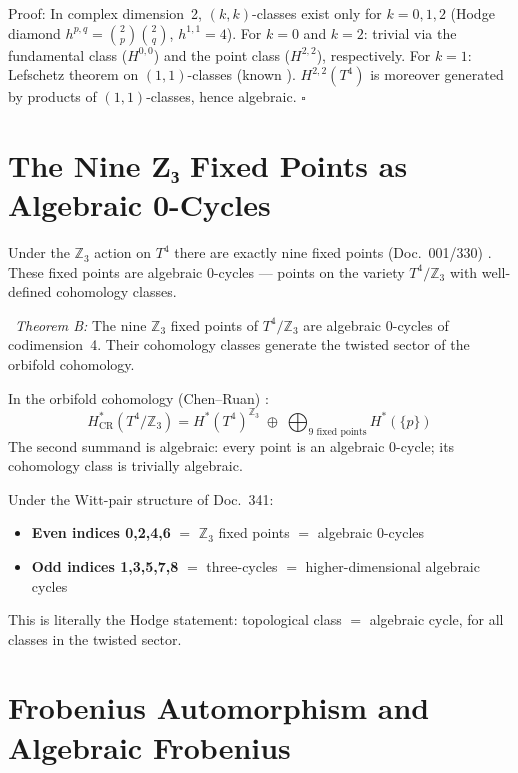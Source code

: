 Proof: In complex dimension~2, $(k,k)$-classes exist only for $k = 0,1,2$
(Hodge diamond $h^{p,q} = \binom{2}{p}\binom{2}{q}$, $h^{1,1} = 4$).
For $k=0$ and $k=2$: trivial via the fundamental class ($H^{0,0}$)
and the point class ($H^{2,2}$), respectively.
For $k=1$: Lefschetz theorem on $(1,1)$-classes (known \EM).
$H^{2,2}(T^4)$ is moreover generated by products of $(1,1)$-classes,
hence algebraic. \hfill$\square$

\section{The Nine Z₃ Fixed Points as Algebraic 0-Cycles}

Under the $\mathbb{Z}_3$ action on $T^4$ there are exactly nine fixed points
(Doc.~001/330) \BM. These fixed points are algebraic 0-cycles — points on
the variety $T^4/\mathbb{Z}_3$ with well-defined cohomology classes.

\BM\ \textit{Theorem B:} The nine $\mathbb{Z}_3$ fixed points of
$T^4/\mathbb{Z}_3$ are algebraic 0-cycles of codimension~4. Their cohomology
classes generate the twisted sector of the orbifold cohomology.

In the orbifold cohomology (Chen--Ruan) \QM:
\[
H^*_{\mathrm{CR}}(T^4/\mathbb{Z}_3)
= H^*(T^4)^{\mathbb{Z}_3}
\;\oplus\; \bigoplus_{\text{9 fixed points}} H^*(\{p\})
\]
The second summand is algebraic: every point is an algebraic 0-cycle; its
cohomology class is trivially algebraic. \EM

Under the Witt-pair structure of Doc.~341:
\begin{itemize}
\item \textbf{Even indices 0,2,4,6} $=$ $\mathbb{Z}_3$ fixed points
      $=$ algebraic 0-cycles \BM
\item \textbf{Odd indices 1,3,5,7,8} $=$ three-cycles
      $=$ higher-dimensional algebraic cycles \BM
\end{itemize}

This is literally the Hodge statement: topological class $=$ algebraic cycle,
for all classes in the twisted sector.

\section{Frobenius Automorphism and Algebraic Frobenius}

